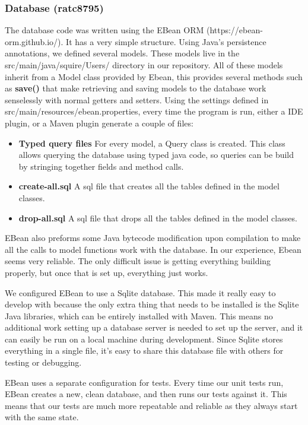 \documentclass[twoside,letterpaper]{article}
\begin{document}
\subsubsection{Database (ratc8795)}
The database code was written using the EBean ORM (https://ebean-orm.github.io/). It has a very simple structure. Using Java's persistence annotations, we defined several models. These models live in the src/main/java/squire/Users/ directory in our repository. All of these models inherit from a Model class provided by Ebean, this provides several methods such as \textbf{save()} that make retrieving and saving models to the database work senselessly with normal getters and setters. Using the settings defined in src/main/resources/ebean.properties, every time the program is run, either a IDE plugin, or a Maven plugin generate a couple of files:
\begin{itemize}
	\item \textbf{Typed query files} For every model, a Query class is created. This class allows querying the database using typed java code, so queries can be build by stringing together fields and method calls.
	\item \textbf{create-all.sql} A sql file that creates all the tables defined in the model classes.
	\item \textbf{drop-all.sql} A sql file that drops all the tables defined in the model classes.
\end{itemize}

EBean also preforms some Java bytecode modification upon compilation to make all the calls to model functions work with the database.
In our experience, Ebean seems very reliable. The only difficult issue is getting everything building properly, but once that is set up, everything just works.

We configured EBean to use a Sqlite database. This made it really easy to develop with because the only extra thing that needs to be installed is the Sqlite Java libraries, which can be entirely installed with Maven. This means no additional work setting up a database server is needed to set up the server, and it can easily be run on a local machine during development. Since Sqlite stores everything in a single file, it's easy to share this database file with others for testing or debugging.

EBean uses a separate configuration for tests. Every time our unit tests run, EBean creates a new, clean database, and then runs our tests against it. This means that our tests are much more repeatable and reliable as they always start with the same state. 
\end{document}
